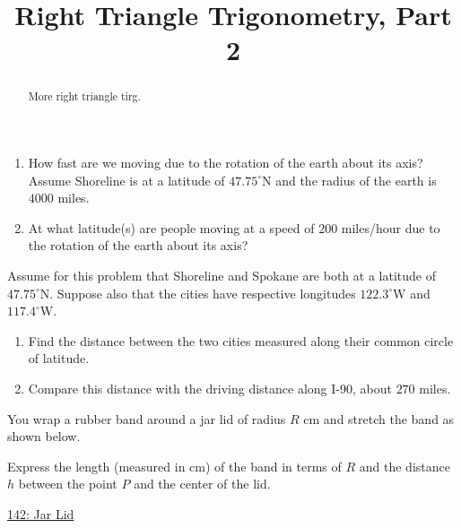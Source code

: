 \documentclass{ximera}
\title{Right Triangle Trigonometry, Part 2}
\begin{document}
\begin{abstract}
More right triangle tirg.
\end{abstract}
\maketitle



\begin{question} \label{Qfksadfsdt4e4}
\begin{enumerate}
\item How fast are we moving due to the rotation of the earth about its axis? Assume Shoreline is at a latitude of $47.75^\circ$N and the radius of the earth is $4000$ miles.

\item At what latitude(s) are people moving at a speed of $200$ miles/hour due to the rotation of the earth about its axis?
\end{enumerate}
\end{question}

\begin{question}  \label{QODfefEREr}
Assume for this problem that Shoreline and Spokane are both at a latitude of $47.75^\circ$N. Suppose also that the cities have respective longitudes $122.3^\circ$W and $117.4^\circ$W. 

\begin{enumerate}
\item Find the distance between the two cities measured along their common circle of latitude.

\item Compare this distance with the driving distance along I-90, about $270$ miles.

\end{enumerate}

\end{question}


\begin{question} \label{QdfRERER}
You wrap a rubber band around a jar lid of radius $R$ cm and stretch the band as shown below.

Express the length (measured in cm) of the band in terms of $R$ and the distance $h$ between the point $P$ and the center of the lid.


\begin{onlineOnly}
    \begin{center}
\end{center}
\end{onlineOnly}

\href{https://www.desmos.com/calculator/wz5qiyj4od}{142: Jar Lid}

\end{question}
\end{document}

